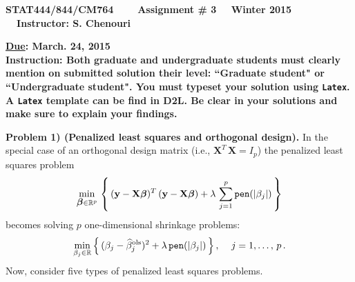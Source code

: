 \documentclass[11pt]{report}
\newcommand{\bfmath}[1]{\mbox{\boldmath$#1$\unboldmath}}
\begin{document}
\begin{center}
{\bf STAT444/844/CM764 ~~~ Assignment \# 3 ~~Winter 2015 ~~Instructor: S. Chenouri}
\end{center} 
\noindent
{\bf \underline {Due}: March. 24, 2015}\\
\noindent
{\bf Instruction: Both graduate and undergraduate students must clearly mention on submitted solution their level: ``Graduate student" or ``Undergraduate student". You must typeset your solution using {\tt Latex}. A  {\tt Latex} template can be find in D2L. Be clear in your solutions and make sure to explain your findings.} \\
\vspace{1mm} 

\noindent
{\bf Problem 1) (Penalized least squares and orthogonal design).} In the special case
of an orthogonal design matrix (i.e., $\mathbf{X}^T\,\mathbf{X}=I_p$) the penalized least squares problem
$$\min\limits_{\bfmath{\beta}\in\mathbb{R}^p}\,\left\lbrace\, (\mathbf{y}-\mathbf{X}\bfmath{\beta})^T\,(\mathbf{y}-\mathbf{X}\bfmath{\beta})+\lambda\,\sum\limits_{j=1}^p {\tt pen}(|\beta_j|)\,\right\rbrace$$
becomes solving $p$ one-dimensional shrinkage problems:
$$\min\limits_{\beta_j\in\mathbb{R}}\left\lbrace\,(\beta_j-\widehat{\beta}_j^{\rm ols})^2+\lambda\,{\tt pen}(|\beta_j|)\,\right\rbrace,\,\quad j=1,\dots,\,p\,.$$
Now, consider five types of penalized least squares problems.
\end{document}

